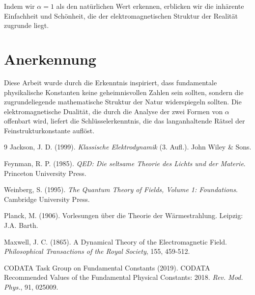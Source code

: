 	Indem wir $\alpha = 1$ als den natürlichen Wert erkennen, erblicken wir die inhärente Einfachheit und Schönheit, die der elektromagnetischen Struktur der Realität zugrunde liegt.
	
	\section{Anerkennung}
	
	Diese Arbeit wurde durch die Erkenntnis inspiriert, dass fundamentale physikalische Konstanten keine geheimnisvollen Zahlen sein sollten, sondern die zugrundeliegende mathematische Struktur der Natur widerspiegeln sollten. Die elektromagnetische Dualität, die durch die Analyse der zwei Formen von $\alpha$ offenbart wird, liefert die Schlüsselerkenntnis, die das langanhaltende Rätsel der Feinstrukturkonstante auflöst.
	
	\begin{thebibliography}{9}
		 Jackson, J. D. (1999). \textit{Klassische Elektrodynamik} (3. Aufl.). John Wiley \& Sons.
		
		 Feynman, R. P. (1985). \textit{QED: Die seltsame Theorie des Lichts und der Materie}. Princeton University Press.
		
		 Weinberg, S. (1995). \textit{The Quantum Theory of Fields, Volume 1: Foundations}. Cambridge University Press.
		
		 Planck, M. (1906). Vorlesungen über die Theorie der Wärmestrahlung. Leipzig: J.A. Barth.
		
		 Maxwell, J. C. (1865). A Dynamical Theory of the Electromagnetic Field. \textit{Philosophical Transactions of the Royal Society}, 155, 459-512.
		
		 CODATA Task Group on Fundamental Constants (2019). CODATA Recommended Values of the Fundamental Physical Constants: 2018. \textit{Rev. Mod. Phys.}, 91, 025009.
	\end{thebibliography}
	